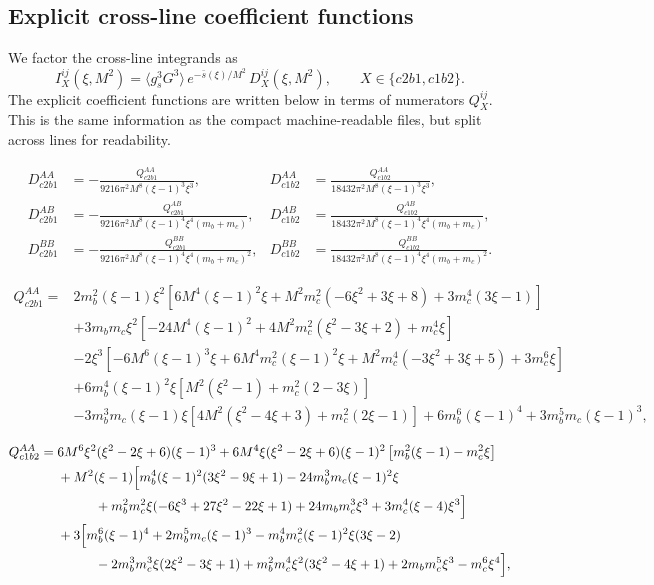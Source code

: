 \documentclass[11pt]{article}
\begin{document}
\subsection*{Explicit cross-line coefficient functions}

We factor the cross-line integrands as
\begin{equation}
  I^{ij}_{X}(\xi,M^2)
  =
  \langle g_s^3G^3\rangle\,
  e^{-\bar s(\xi)/M^2}\,
  D^{ij}_{X}(\xi,M^2),
  \qquad X\in\{c2b1,c1b2\}.
\end{equation}
The explicit coefficient functions are written below in terms of numerators
\(Q^{ij}_{X}\).  This is the same information as the compact machine-readable
files, but split across lines for readability.

\begin{landscape}
\begingroup
\small

\begin{align}
D^{AA}_{c2b1} &=
-\frac{Q^{AA}_{c2b1}}{9216\pi^2M^8(\xi-1)^3\xi^3},&
D^{AA}_{c1b2} &=
\frac{Q^{AA}_{c1b2}}{18432\pi^2M^8(\xi-1)^3\xi^3},\nonumber\\
D^{AB}_{c2b1} &=
-\frac{Q^{AB}_{c2b1}}{9216\pi^2M^8(\xi-1)^4\xi^4(m_b+m_c)},&
D^{AB}_{c1b2} &=
\frac{Q^{AB}_{c1b2}}{18432\pi^2M^8(\xi-1)^4\xi^4(m_b+m_c)},\nonumber\\
D^{BB}_{c2b1} &=
-\frac{Q^{BB}_{c2b1}}{9216\pi^2M^8(\xi-1)^4\xi^4(m_b+m_c)^2},&
D^{BB}_{c1b2} &=
\frac{Q^{BB}_{c1b2}}{18432\pi^2M^8(\xi-1)^4\xi^4(m_b+m_c)^2}.
\end{align}

\begin{align}
Q^{AA}_{c2b1}={}&
2m_b^2(\xi-1)\xi^2
\left[6M^4(\xi-1)^2\xi+M^2m_c^2(-6\xi^2+3\xi+8)+3m_c^4(3\xi-1)\right]\nonumber\\
&+3m_bm_c\xi^2
\left[-24M^4(\xi-1)^2+4M^2m_c^2(\xi^2-3\xi+2)+m_c^4\xi\right]\nonumber\\
&-2\xi^3
\left[-6M^6(\xi-1)^3\xi+6M^4m_c^2(\xi-1)^2\xi
+M^2m_c^4(-3\xi^2+3\xi+5)+3m_c^6\xi\right]\nonumber\\
&+6m_b^4(\xi-1)^2\xi
\left[M^2(\xi^2-1)+m_c^2(2-3\xi)\right]\nonumber\\
&-3m_b^3m_c(\xi-1)\xi
\left[4M^2(\xi^2-4\xi+3)+m_c^2(2\xi-1)\right]
+6m_b^6(\xi-1)^4+3m_b^5m_c(\xi-1)^3,
\end{align}

\begin{align}
Q^{AA}_{c1b2}={}&
6M^6\xi^2(\xi^2-2\xi+6)(\xi-1)^3
+6M^4\xi(\xi^2-2\xi+6)(\xi-1)^2
\left[m_b^2(\xi-1)-m_c^2\xi\right]\nonumber\\
&+M^2(\xi-1)\Big[
m_b^4(\xi-1)^2(3\xi^2-9\xi+1)
-24m_b^3m_c(\xi-1)^2\xi\nonumber\\
&\hspace{1.0cm}
+m_b^2m_c^2\xi(-6\xi^3+27\xi^2-22\xi+1)
+24m_bm_c^3\xi^3+3m_c^4(\xi-4)\xi^3\Big]\nonumber\\
&+3\Big[
m_b^6(\xi-1)^4+2m_b^5m_c(\xi-1)^3
-m_b^4m_c^2(\xi-1)^2\xi(3\xi-2)\nonumber\\
&\hspace{1.0cm}
-2m_b^3m_c^3\xi(2\xi^2-3\xi+1)
+m_b^2m_c^4\xi^2(3\xi^2-4\xi+1)
+2m_bm_c^5\xi^3-m_c^6\xi^4\Big],
\end{align}


\end{landscape}
\end{document}
